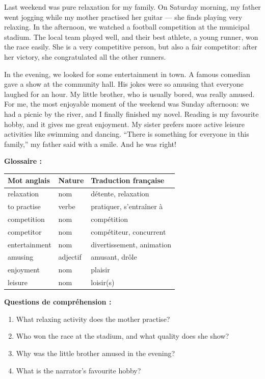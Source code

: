 \documentclass[11pt]{article}
\begin{document}
\begin{textebox}
Last weekend was pure relaxation for my family. On Saturday morning, my father went jogging while my mother practised her guitar — she finds playing very relaxing. In the afternoon, we watched a football competition at the municipal stadium. The local team played well, and their best athlete, a young runner, won the race easily. She is a very competitive person, but also a fair competitor: after her victory, she congratulated all the other runners.

In the evening, we looked for some entertainment in town. A famous comedian gave a show at the community hall. His jokes were so amusing that everyone laughed for an hour. My little brother, who is usually bored, was really amused. For me, the most enjoyable moment of the weekend was Sunday afternoon: we had a picnic by the river, and I finally finished my novel. Reading is my favourite hobby, and it gives me great enjoyment. My sister prefers more active leisure activities like swimming and dancing. “There is something for everyone in this family,” my father said with a smile. And he was right!
\end{textebox}

\textbf{Glossaire :}

\begin{center}
\begin{tabularx}{\linewidth}{|l|l|X|}
\hline
\rowcolor{popblueL} Mot anglais & Nature & Traduction française \\
\hline
relaxation & nom & détente, relaxation \\
\hline
to practise & verbe & pratiquer, s'entraîner à \\
\hline
competition & nom & compétition \\
\hline
competitor & nom & compétiteur, concurrent \\
\hline
entertainment & nom & divertissement, animation \\
\hline
amusing & adjectif & amusant, drôle \\
\hline
enjoyment & nom & plaisir \\
\hline
leisure & nom & loisir(s) \\
\hline
\end{tabularx}
\end{center}

\textbf{Questions de compréhension :}
\begin{enumerate}
\item What relaxing activity does the mother practise?
\item Who won the race at the stadium, and what quality does she show?
\item Why was the little brother amused in the evening?
\item What is the narrator's favourite hobby?
\end{enumerate}
\end{document}
